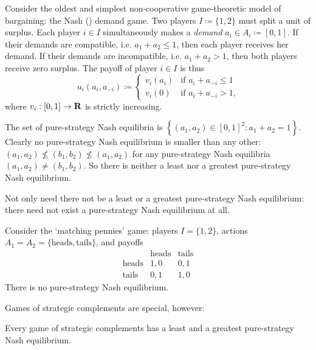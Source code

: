 \begin{example}
	\label{example:nash_demand}
	Consider the oldest and simplest non-cooperative game-theoretic model of bargaining: the Nash (\citeyear{Nash1953}) demand game. Two players $I \coloneqq \{1,2\}$ must split a unit of surplus. Each player $i \in I$ simultaneously makes a \emph{demand} $a_i \in A_i \coloneqq [0,1]$. If their demands are compatible, i.e. $a_1+a_2 \leq 1$, then each player receives her demand. If their demands are incompatible, i.e. $a_1+a_2 > 1$, then both players receive zero surplus. The payoff of player $i \in I$ is thus
	\begin{equation*}
		u_i(a_i,a_{-i}) \coloneqq
		\begin{cases}
			v_i(a_i) & \text{if $a_i+a_{-i} \leq 1$} \\
			v_i(0) & \text{if $a_i+a_{-i} > 1$,} 
		\end{cases}
	\end{equation*}
	where $v_i : [0,1] \to \mathbf{R}$ is strictly increasing.

	The set of pure-strategy Nash equilibria is $\left\{ (a_1,a_2) \in [0,1]^2 : a_1+a_2=1 \right\}$. Clearly no pure-strategy Nash equilibrium is smaller than any other: $(a_1,a_2) \nleq (b_1,b_2) \nleq (a_1,a_2)$ for any pure-strategy Nash equilibria $(a_1,a_2) \neq (b_1,b_2)$. So there is neither a least nor a greatest pure-strategy Nash equilibrium.
\end{example}

Not only need there not be a least or a greatest pure-strategy Nash equilibrium: there need not exist a pure-strategy Nash equilibrium at all.

\begin{example}
	\label{example:pennies}
	Consider the `matching pennies' game: players $I=\{1,2\}$, actions $A_1 = A_2 = \{\text{heads},\text{tails}\}$, and payoffs
	\begin{equation*}
		\begin{array}{c|cc}
			  & \text{heads}   & \text{tails} \\ \hline
			\text{heads} & 1,0 & 0,1 \\
			\text{tails} & 0,1 & 1,0
		\end{array}
	\end{equation*}
	There is no pure-strategy Nash equilibrium.
\end{example}

Games of strategic complements are special, however:

\begin{theorem}
	\label{theorem:spm_game_nash}
	Every game of strategic complements has a least and a greatest pure-strategy Nash equilibrium.
\end{theorem}

